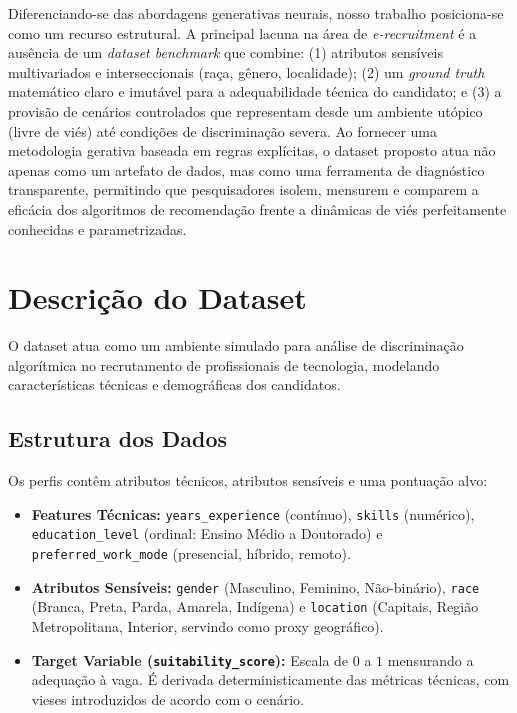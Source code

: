 \documentclass[12pt]{article}
\begin{document}
Diferenciando-se das abordagens generativas neurais, nosso trabalho posiciona-se como um recurso estrutural. A principal lacuna na área de \textit{e-recruitment} é a ausência de um \textit{dataset benchmark} que combine: (1) atributos sensíveis multivariados e interseccionais (raça, gênero, localidade); (2) um \textit{ground truth} matemático claro e imutável para a adequabilidade técnica do candidato; e (3) a provisão de cenários controlados que representam desde um ambiente utópico (livre de viés) até condições de discriminação severa. Ao fornecer uma metodologia gerativa baseada em regras explícitas, o dataset proposto atua não apenas como um artefato de dados, mas como uma ferramenta de diagnóstico transparente, permitindo que pesquisadores isolem, mensurem e comparem a eficácia dos algoritmos de recomendação frente a dinâmicas de viés perfeitamente conhecidas e parametrizadas.

\section{Descrição do Dataset}

O dataset atua como um ambiente simulado para análise de discriminação algorítmica no recrutamento de profissionais de tecnologia, modelando características técnicas e demográficas dos candidatos.

\subsection{Estrutura dos Dados}

Os perfis contêm atributos técnicos, atributos sensíveis e uma pontuação alvo:

\begin{itemize}
    \item \textbf{Features Técnicas:} \texttt{years\_experience} (contínuo), \texttt{skills} (numérico), \texttt{education\_level} (ordinal: Ensino Médio a Doutorado) e \texttt{preferred\_work\_mode} (presencial, híbrido, remoto).
    \item \textbf{Atributos Sensíveis:} \texttt{gender} (Masculino, Feminino, Não-binário), \texttt{race} (Branca, Preta, Parda, Amarela, Indígena) e \texttt{location} (Capitais, Região Metropolitana, Interior, servindo como proxy geográfico).
    \item \textbf{Target Variable (\texttt{suitability\_score}):} Escala de $0$ a $1$ mensurando a adequação à vaga. É derivada deterministicamente das métricas técnicas, com vieses introduzidos de acordo com o cenário.
\end{itemize}
\end{document}
